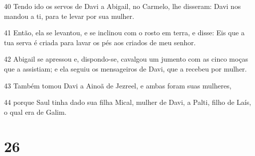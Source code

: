 \par 40 Tendo ido os servos de Davi a Abigail, no Carmelo, lhe disseram: Davi nos mandou a ti, para te levar por sua mulher.
\par 41 Então, ela se levantou, e se inclinou com o rosto em terra, e disse: Eis que a tua serva é criada para lavar os pés aos criados de meu senhor.
\par 42 Abigail se apressou e, dispondo-se, cavalgou um jumento com as cinco moças que a assistiam; e ela seguiu os mensageiros de Davi, que a recebeu por mulher.
\par 43 Também tomou Davi a Ainoã de Jezreel, e ambas foram suas mulheres,
\par 44 porque Saul tinha dado sua filha Mical, mulher de Davi, a Palti, filho de Laís, o qual era de Galim.

\chapter{26}


